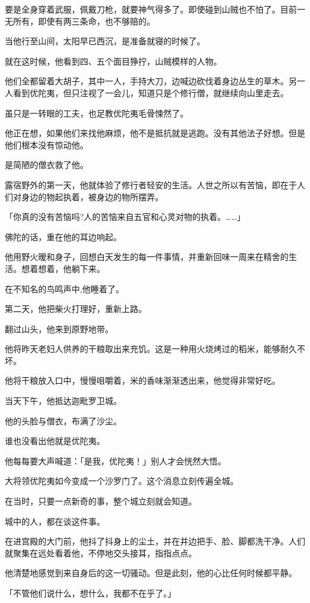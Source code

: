 \documentclass[twoside,openany]{book}
\begin{document}
要是全身穿着武服，佩戴刀枪，就要神气得多了。即使碰到山贼也不怕了。目前一无所有，即使有两三条命，也不够赔的。

当他行至山间，太阳早已西沉，是准备就寝的时候了。

就在这时候，他看到四、五个面目狰拧，山贼模样的人物。

他们全都留着大胡子，其中一人，手持大刀，边喊边砍伐着身边丛生的草木。另一人看到优陀夷，但只注视了一会儿，知道只是个修行僧，就继续向山里走去。

虽只是一转眼的工夫，也足教优陀夷毛骨悚然了。

他正在想，如果他们来找他麻烦，他不是抵抗就是逃跑。没有其他法子好想。但是他们根本没有惊动他。

是简陋的僧衣救了他。

露宿野外的第一天，他就体验了修行者轻安的生活。人世之所以有苦恼，即在于人们对身边的物起执着，被身边的物所摆弄。

「你真的没有苦恼吗?人的苦恼来自五官和心灵对物的执着。……」

佛陀的话，重在他的耳边响起。

他用野火暧和身子，回想白天发生的每一件事情，并重新回味一周来在精舍的生活。想着想着，他躺下来。

在不知名的鸟鸣声中,他睡着了。

第二天，他把柴火打理好，重新上路。

翻过山头，他来到原野地带。

他将昨天老妇人供养的干粮取出来充饥。这是一种用火烧烤过的稻米，能够耐久不坏。

他将干粮放入口中，慢慢咀嚼着，米的香味渐渐透出来，他觉得非常好吃。

当天下午，他抵达迦毗罗卫城。

他的头脸与僧衣，布满了沙尘。

谁也没看出他就是优陀夷。

他每每要大声喊道：「是我，优陀夷！」别人才会恍然大悟。

大将领优陀夷如今变成一个沙罗门了。这个消息立刻传遍全城。

在当时，只要一点新奇的事，整个城立刻就会知道。

城中的人，都在谈这件事。

在进宫殿的大门前，他抖了抖身上的尘土，并在井边把手、脸、脚都洗干净。人们就聚集在远处看着他，不停地交头接耳，指指点点。

他清楚地感觉到来自身后的这一切骚动。但是此刻，他的心比任何时候都平静。

「不管他们说什么，想什么，我都不在乎了。」
\end{document}
